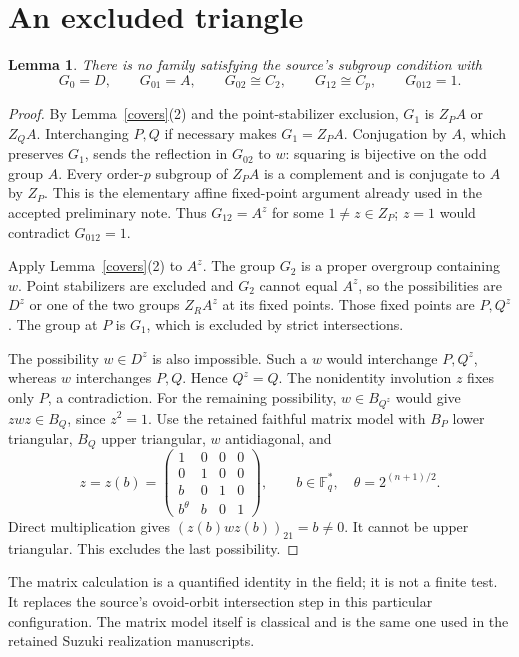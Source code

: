 \documentclass[11pt,a4paper]{article}
\newtheorem{lemma}{Lemma}
\newcommand{\F}{\mathbb F}
\begin{document}
\section{An excluded triangle}
\begin{lemma}\label{triangle}
There is no family satisfying the source's subgroup condition with
\[
 G_0=D,\qquad G_{01}=A,\qquad G_{02}\cong C_2,
 \qquad G_{12}\cong C_p,\qquad G_{012}=1.
\]
\end{lemma}
\begin{proof}
By Lemma~\ref{covers}(2) and the point-stabilizer exclusion,
$G_1$ is $Z_PA$ or $Z_QA$. Interchanging $P,Q$ if necessary makes
$G_1=Z_PA$. Conjugation by $A$, which preserves $G_1$, sends the
reflection in $G_{02}$ to $w$: squaring is bijective on the odd group
$A$. Every order-$p$ subgroup of $Z_PA$ is a complement and is conjugate
to $A$ by $Z_P$. This is the elementary affine fixed-point argument
already used in the accepted preliminary note. Thus
$G_{12}=A^z$ for some $1\ne z\in Z_P$; $z=1$ would contradict
$G_{012}=1$.

Apply Lemma~\ref{covers}(2) to $A^z$. The group $G_2$ is a proper
overgroup containing $w$. Point stabilizers are excluded and $G_2$ cannot
equal $A^z$, so the possibilities are $D^z$ or one of the two groups
$Z_RA^z$ at its fixed points. Those fixed points are $P,Q^z$.
The group at $P$ is $G_1$, which is excluded by strict intersections.

The possibility $w\in D^z$ is also impossible. Such a $w$ would
interchange $P,Q^z$, whereas $w$ interchanges $P,Q$. Hence $Q^z=Q$.
The nonidentity involution $z$ fixes only $P$, a contradiction.
For the remaining possibility, $w\in B_{Q^z}$ would give
$zwz\in B_Q$, since $z^2=1$. Use the retained faithful matrix model
with $B_P$ lower triangular, $B_Q$ upper triangular, $w$ antidiagonal,
and
\[
 z=z(b)=
 \begin{pmatrix}
 1&0&0&0\\0&1&0&0\\b&0&1&0\\b^\theta&b&0&1
 \end{pmatrix},\qquad
 b\in\F_q^*,\quad\theta=2^{(n+1)/2}.
\]
Direct multiplication gives $(z(b)wz(b))_{21}=b\ne0$. It cannot
be upper triangular. This excludes the last possibility.
\end{proof}

The matrix calculation is a quantified identity in the field; it is
not a finite test. It replaces the source's ovoid-orbit intersection
step in this particular configuration. The matrix model itself is
classical and is the same one used in the retained Suzuki realization
manuscripts.
\end{document}
